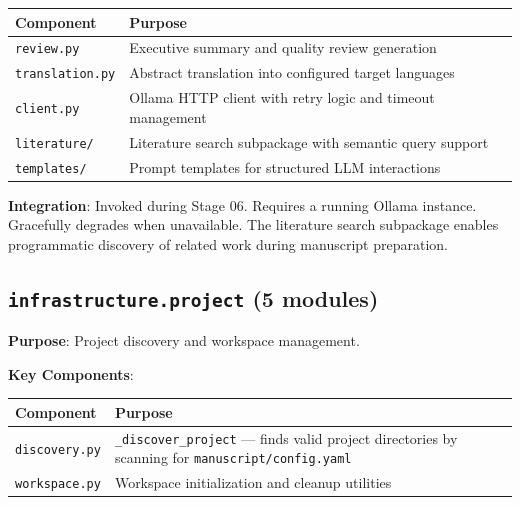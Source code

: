 \documentclass[
]{article}
\newcounter{none} %
\begin{document}
{\def\LTcaptype{none} %
\begin{longtable}[]{@{}
  >{\raggedright\arraybackslash}p{}
  >{\raggedright\arraybackslash}p{}@{}}
\toprule\noalign{}
\begin{minipage}[b]{\linewidth}\raggedright
Component
\end{minipage} & \begin{minipage}[b]{\linewidth}\raggedright
Purpose
\end{minipage} \\
\midrule\noalign{}
\endhead
\bottomrule\noalign{}
\endlastfoot
\texttt{review.py} & Executive summary and quality review generation \\
\texttt{translation.py} & Abstract translation into configured target
languages \\
\texttt{client.py} & Ollama HTTP client with retry logic and timeout
management \\
\texttt{literature/} & Literature search subpackage with semantic query
support \\
\texttt{templates/} & Prompt templates for structured LLM
interactions \\
\end{longtable}
}

\textbf{Integration}: Invoked during Stage 06. Requires a running Ollama
instance. Gracefully degrades when unavailable. The literature search
subpackage enables programmatic discovery of related work during
manuscript preparation.

\subsection{\texorpdfstring{\texttt{infrastructure.project} (5
modules)}{infrastructure.project (5 modules)}}\label{infrastructure.project-5-modules}

\textbf{Purpose}: Project discovery and workspace management.

\textbf{Key Components}:

{\def\LTcaptype{none} %
\begin{longtable}[]{@{}
  >{\raggedright\arraybackslash}p{}
  >{\raggedright\arraybackslash}p{}@{}}
\toprule\noalign{}
\begin{minipage}[b]{\linewidth}\raggedright
Component
\end{minipage} & \begin{minipage}[b]{\linewidth}\raggedright
Purpose
\end{minipage} \\
\midrule\noalign{}
\endhead
\bottomrule\noalign{}
\endlastfoot
\texttt{discovery.py} & \texttt{\_discover\_project} --- finds valid
project directories by scanning for \texttt{manuscript/config.yaml} \\
\texttt{workspace.py} & Workspace initialization and cleanup
utilities \\
\end{longtable}
}
\end{document}
